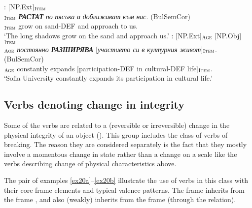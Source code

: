 \documentclass[output=paper,colorlinks,citecolor=brown]{langscibook}
\begin{document}
 \begin{exe}
 \ex \label{ex201}
 \begin{xlist}
\ex \label{ex201a} : [NP.Ext]$_{\text{\textsc{Item}}}$ \\
$_{\text{\textsc{Item}}}$ \textit{\textbf{РАСТАТ}} \textit{по} \textit{пясъка} \textit{и} \textit{доближават} \textit{към} \textit{нас}.  (BulSemCor)\\
[Long-DEF shadows]$_{\text{\textsc{Item}}}$ grow on sand-DEF and approach to us. {}\\
\glt `The long shadows grow on the sand and approach us.'
\ex \label{ex201b}  : [NP.Ext]$_{\text{\textsc{Age}}}$ [NP.Obj]$_{\text{\textsc{Item}}}$  \\
$_{\text{\textsc{Age}}}$ \textit{постоянно} \textit{\textbf{РАЗШИРЯВА}} [\textit{участието си} \textit{в} \textit{културния} \textit{живот}]$_{\text{\textsc{Item}}}$.  (BulSemCor)\\
[{Sofia-DEF} {University}]$_{\text{\textsc{Age}}}$ constantly expands [participation-DEF in cultural-DEF life]$_{\text{\textsc{Item}}}$. {}\\
\glt `Sofia University constantly expands its participation in cultural life.'
 \end{xlist}
 \end{exe}



\subsection{Verbs denoting change in integrity}\label{sec:breaking}


Some of the verbs are related to a (reversible or irreversible) change in the physical integrity of an object (). This group includes the class of verbs of breaking. The reason they are considered separately is the fact that they mostly involve a momentous change in state rather than a change on a scale like the verbs describing change of physical characteristics above.

The pair of examples \ref{ex20a}--\ref{ex20b} illustrate the use of verbs in this class with their core frame elements and typical valence patterns. The frame  inherits from the frame , and also  (weakly) inherits from the frame  (through the  relation).
\end{document}
